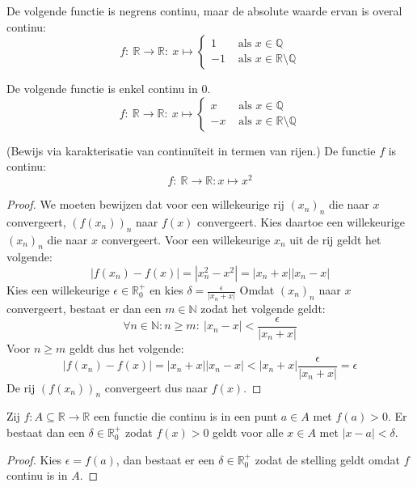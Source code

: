 \documentclass[main.tex]{subfiles}
\begin{document}
\begin{vb}
  De volgende functie is negrens continu, maar de absolute waarde ervan is overal continu:
  \[ 
  f:\ \mathbb{R} \rightarrow \mathbb{R}:\ x \mapsto
  \begin{cases}
    1  &\text{ als } x\in \mathbb{Q}\\
    -1 &\text{ als } x\in \mathbb{R}\setminus \mathbb{Q}
  \end{cases}
  \]
\end{vb}

\begin{vb}
  De volgende functie is enkel continu in $0$.
  \[ 
  f:\ \mathbb{R} \rightarrow \mathbb{R}:\ x \mapsto
  \begin{cases}
    x  &\text{ als } x\in \mathbb{Q}\\
    -x &\text{ als } x\in \mathbb{R}\setminus \mathbb{Q}
  \end{cases}
  \]
\end{vb}

\begin{vb}
  (Bewijs via karakterisatie van continu\"iteit in termen van rijen.)
  De functie $f$ is continu:
  \[ f:\ \mathbb{R} \rightarrow \mathbb{R}: x \mapsto x^{2} \]
  
  \begin{proof}
    We moeten bewijzen dat voor een willekeurige rij $(x_{n})_{n}$ die naar $x$ convergeert, $(f(x_{n}))_{n}$ naar $f(x)$ convergeert.
    Kies daartoe een willekeurige $(x_{n})_{n}$ die naar $x$ convergeert.
    Voor een willekeurige $x_{n}$ uit de rij geldt het volgende:
    \[ |f(x_{n})-f(x)| = |x_{n}^{2}-x^{2}| = |x_{n}+x||x_{n}-x| \]
    Kies een willekeurige $\epsilon \in \mathbb{R}_{0}^{+}$ en kies $\delta = \frac{\epsilon}{|x_{n}+x|}$
    Omdat $(x_{n})_{n}$ naar $x$ convergeert, bestaat er dan een $m\in \mathbb{N}$ zodat het volgende geldt:
    \[ \forall n\in \mathbb{N}: n \ge m:\ |x_{n}-x| < \frac{\epsilon}{|x_{n}+x|} \]
    Voor $n \ge m$ geldt dus het volgende:
    \[ |f(x_{n})-f(x)| = |x_{n}+x||x_{n}-x| < |x_{n}+x|\frac{\epsilon}{|x_{n}+x|} = \epsilon \]
    De rij $(f(x_{n}))_{n}$ convergeert dus naar $f(x)$.
  \end{proof}
\end{vb}

\begin{vb}
  Zij $f: A \subseteq \mathbb{R} \rightarrow \mathbb{R}$ een functie die continu is in een punt $a\in A$ met $f(a) > 0$.
  Er bestaat dan een $\delta \in \mathbb{R}_{0}^{+}$ zodat $f(x)>0$ geldt voor alle $x\in A$ met $|x-a| < \delta$.

  \begin{proof}
    Kies $\epsilon = f(a)$, dan bestaat er een $\delta \in \mathbb{R}_{0}^{+}$ zodat de stelling geldt omdat $f$ continu is in $A$.
  \end{proof}
\end{vb}
\end{document}

